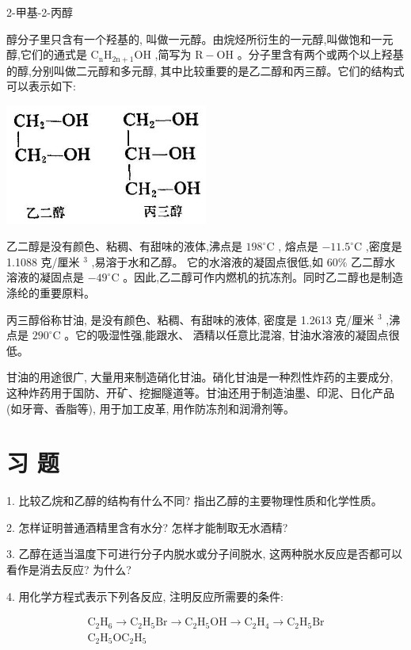 \documentclass[10pt]{article}
\begin{document}
2-甲基-2-丙醇

醇分子里只含有一个羟基的, 叫做一元醇。由烷烃所衍生的一元醇,叫做饱和一元醇,它们的通式是 \({\mathrm{C}}_{\mathrm{n}}{\mathrm{H}}_{2\mathrm{n} + 1}\mathrm{{OH}}\) ,简写为 \(\mathrm{R} - \mathrm{{OH}}\) 。分子里含有两个或两个以上羟基的醇,分别叫做二元醇和多元醇, 其中比较重要的是乙二醇和丙三醇。它们的结构式可以表示如下:

\begin{center}
\includegraphics[max width=0.5\textwidth]{images/01912d16-be99-77bb-9535-4f3ed8d9946f_119_766125.jpg}
\end{center}

乙二醇是没有颜色、粘稠、有甜味的液体,沸点是 \({198}^{ \circ }\mathrm{C}\) , 熔点是 \(- {11.5}^{ \circ }\mathrm{C}\) ,密度是 1.1088 克/厘米 \({}^{3}\) ,易溶于水和乙醇。 它的水溶液的凝固点很低,如 \({60}\%\) 乙二醇水溶液的凝固点是 \(- {49}^{ \circ }\mathrm{C}\) 。因此,乙二醇可作内燃机的抗冻剂。同时乙二醇也是制造涤纶的重要原料。

丙三醇俗称甘油, 是没有颜色、粘稠、有甜味的液体, 密度是 1.2613 克/厘米 \({}^{3}\) ,沸点是 \({290}^{ \circ }\mathrm{C}\) 。它的吸湿性强,能跟水、 酒精以任意比混溶, 甘油水溶液的凝固点很低。

甘油的用途很广, 大量用来制造硝化甘油。硝化甘油是一种烈性炸药的主要成分, 这种炸药用于国防、开矿、挖掘隧道等。甘油还用于制造油墨、印泥、日化产品(如牙膏、香脂等), 用于加工皮革, 用作防冻剂和润滑剂等。

\section*{习 题}

1. 比较乙烷和乙醇的结构有什么不同? 指出乙醇的主要物理性质和化学性质。

2. 怎样证明普通酒精里含有水分? 怎样才能制取无水酒精?

3. 乙醇在适当温度下可进行分子内脱水或分子间脱水, 这两种脱水反应是否都可以看作是消去反应? 为什么?

4. 用化学方程式表示下列各反应, 注明反应所需要的条件:

\[
\begin{matrix} {\mathrm{C}}_{2}{\mathrm{H}}_{6} \rightarrow {\mathrm{C}}_{2}{\mathrm{H}}_{5}\mathrm{{Br}} \rightarrow {\mathrm{C}}_{2}{\mathrm{H}}_{5}\mathrm{{OH}} \rightarrow {\mathrm{C}}_{2}{\mathrm{H}}_{4} \rightarrow {\mathrm{C}}_{2}{\mathrm{H}}_{5}\mathrm{{Br}} \\ {\mathrm{C}}_{2}{\mathrm{H}}_{5}{\mathrm{{OC}}}_{2}{\mathrm{H}}_{5} \end{matrix}
\]
\end{document}
